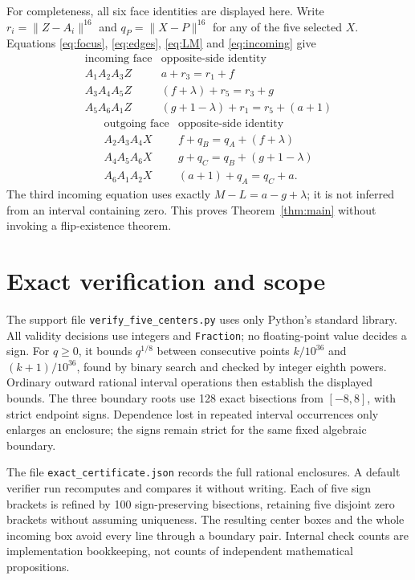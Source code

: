 \documentclass[11pt]{article}
\newcommand{\N}[2]{\lVert #1-#2\rVert^{16}}
\begin{document}
For completeness, all six face identities are displayed here. Write $r_i=\N{Z}{A_i}$ and $q_P=\N{X}{P}$ for any of the five selected $X$. Equations \eqref{eq:focus}, \eqref{eq:edges}, \eqref{eq:LM} and \eqref{eq:incoming} give
\[
\begin{array}{c|l}
\text{incoming face}&\text{opposite-side identity}\\\hline
 A_1A_2A_3Z&a+r_3=r_1+f\\
 A_3A_4A_5Z&(f+\lambda)+r_5=r_3+g\\
 A_5A_6A_1Z&(g+1-\lambda)+r_1=r_5+(a+1)
\end{array}
\]
\[
\begin{array}{c|l}
\text{outgoing face}&\text{opposite-side identity}\\\hline
 A_2A_3A_4X&f+q_B=q_A+(f+\lambda)\\
 A_4A_5A_6X&g+q_C=q_B+(g+1-\lambda)\\
 A_6A_1A_2X&(a+1)+q_A=q_C+a.
\end{array}
\]
The third incoming equation uses exactly $M-L=a-g+\lambda$; it is not inferred from an interval containing zero. This proves Theorem~\ref{thm:main} without invoking a flip-existence theorem.

\section{Exact verification and scope}
The support file \texttt{verify\_five\_centers.py} uses only Python's standard library. All validity decisions use integers and \texttt{Fraction}; no floating-point value decides a sign. For $q\geq0$, it bounds $q^{1/8}$ between consecutive points $k/10^{36}$ and $(k+1)/10^{36}$, found by binary search and checked by integer eighth powers. Ordinary outward rational interval operations then establish the displayed bounds. The three boundary roots use 128 exact bisections from $[-8,8]$, with strict endpoint signs. Dependence lost in repeated interval occurrences only enlarges an enclosure; the signs remain strict for the same fixed algebraic boundary.

The file \texttt{exact\_certificate.json} records the full rational enclosures. A default verifier run recomputes and compares it without writing. Each of five sign brackets is refined by 100 sign-preserving bisections, retaining five disjoint zero brackets without assuming uniqueness. The resulting center boxes and the whole incoming box avoid every line through a boundary pair. Internal check counts are implementation bookkeeping, not counts of independent mathematical propositions.
\end{document}
